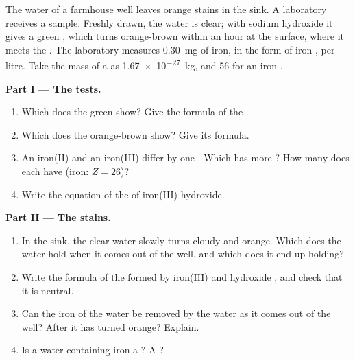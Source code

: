 \begin{problem}
\label{pb:g9:ions:1}
The water of a farmhouse well leaves orange stains in the sink. A
laboratory receives a sample. Freshly drawn, the water is clear; with
sodium hydroxide it gives a green , which turns orange-brown
within an hour at the surface, where it meets the . The laboratory
measures \qty{0.30}{mg} of iron, in the form of iron , per litre.
Take the mass of a  as \qty{1.67e-27}{kg}, and 56  for an
iron .

\medskip
\noindent\textbf{Part I --- The tests.}
\begin{enumerate}
  \item Which  does the green  show? Give the formula of
        the .
  \item Which  does the orange-brown  show? Give its
        formula.
  \item An iron(II)  and an iron(III)  differ by one .
        Which has more ? How many  does each have
        (iron: $Z = 26$)?
  \item Write the equation of the  of iron(III) hydroxide.
\end{enumerate}

\medskip
\noindent\textbf{Part II --- The stains.}
\begin{enumerate}[resume]
  \item In the sink, the clear water slowly turns cloudy and orange. Which
         does the water hold when it comes out of the well, and which
        does it end up holding?
  \item Write the formula of the  formed by iron(III) 
        and hydroxide , and check that it is neutral.
  \item Can the iron of the water be removed by  the water as it
        comes out of the well? After it has turned orange? Explain.
  \item Is a water containing iron  a ? A ?
\end{enumerate}


\end{problem}
